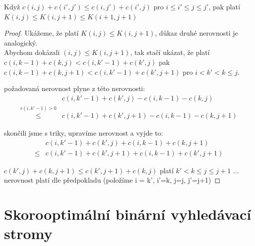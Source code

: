 \begin{lemma}
Když $c(i,j) + c(i',j') \leq c(i,j') + c(i',j)$ pro $i \leq i' \leq j \leq
j'$, pak platí \\
$K(i,j) \leq K(i,j+1) \leq K(i+1,j+1)$
\end{lemma}

\begin{proof}
Ukážeme, že platí $K(i,j) \leq K(i,j+1)$, důkaz druhé nerovnosti je
analogický. \\
Abychom dokázali $(i,j) \leq K(i,j+1)$, tak stačí ukázat, že platí \\
$c(i,k-1) + c(k,j) <  c(i,k'-1) + c(k',j)$ pak
$c(i,k-1) + c(k,j+1) <  c(i,k'-1) + c(k',j+1)$ pro $i < k' < k \leq j$.

požadovaná nerovnost plyne z této nerovnosti: \\
\begin{align*}
&c(i,k'-1) + c(k',j) - c(i,k-1) - c(k,j) \\
\stackrel{c(i,k'-1) > 0}{\leq} 
&c(i,k'-1) + c(k',j+1) - c(i,k-1) - c(k,j+1)
\end{align*}

skončili jsme s triky, upravíme nerovnost a vyjde to: \\
\begin{align*}
&c(i,k'-1) + c(k',j) + c(i,k-1) + c(k,j+1) \\
\leq &c(i,k'-1) + c(k',j+1) + c(i,k-1) + c(k',j+1) 
\end{align*}

$c(k',j) + c(k,j+1) \leq c(k',j+1) + c(k,j)$
platí $k' < k \leq j \leq j+1$ ... nerovnost platí dle předpokladu
(položíme i = k', i'=k, j=j, j'=j+1)
\end{proof}


\section{Skorooptimální binární vyhledávací stromy}


\newtheorem{fakt}{Fakt}

\renewcommand{\labelenumi}{\arabic{enumi})}
\newcommand{\oops}[1]{\textbf{#1}}


